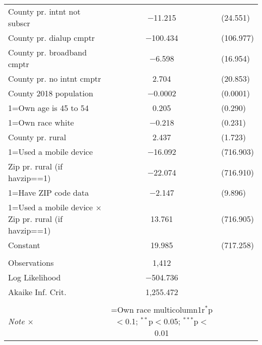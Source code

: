 \begin{table}[!htbp]
\begin{tabular}{@{\extracolsep{5pt}}lc}
  County pr. intnt not subscr & $-$11.215 & (24.551) \\ 
  County pr. dialup cmptr & $-$100.434 & (106.977) \\ 
  County pr. broadband cmptr & $-$6.598 & (16.954) \\ 
  County pr. no intnt cmptr & 2.704 & (20.853) \\ 
  County 2018 population & $-$0.0002 & (0.0001) \\ 
  1=Own age is 45 to 54 & 0.205 & (0.290) \\ 
  1=Own race white & $-$0.218 & (0.231) \\ 
  County pr. rural & 2.437 & (1.723) \\ 
  1=Used a mobile device & $-$16.092 & (716.903) \\ 
  Zip pr. rural (if havzip==1) & $-$22.074 & (716.910) \\ 
  1=Have ZIP code data & $-$2.147 & (9.896) \\ 
  1=Used a mobile device $\times$ Zip pr. rural (if havzip==1) & 13.761 & (716.905) \\ 
  Constant & 19.985 & (717.258) \\ 
 \hline \\[-1.8ex] 
Observations & 1,412 \\ 
Log Likelihood & $-$504.736 \\ 
Akaike Inf. Crit. & 1,255.472 \\ 
\hline 
\hline \\[-1.8ex] 
\textit{Note $\times$ }  & \1=Own race multicolumn{1}{r}{$^{*}$p$<$0.1; $^{**}$p$<$0.05; $^{***}$p$<$0.01} \\ 
\end{tabular} 
\end{table} 
